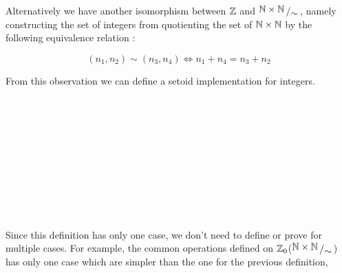 \documentclass{article}
\begin{document}
Alternatively we have another isomorphism between $\mathbb{Z}$ and
$\bigslant{\N\times\N}{\sim}$, namely constructing the set of integers
from quotienting the set of $\mathbb{N}\times\mathbb{N}$ by the following equivalence relation :

\begin{equation}
(n_1 , n_2) \sim (n_3 , n_4)\iff n_1 + n_4 = n_3 + n_2
\end{equation}
 
From this observation we can define a setoid implementation for integers.

\begin{code}\>\<%
\\
%
\\
%
\\
\>  \AgdaSymbol{:}  \<%
\\
\>[0]\<[2]%
\>[2]\AgdaInductiveConstructor{\_,\_} \AgdaSymbol{:}     \<%
\\
%
\\
\> \<[34]%
\>[34]\AgdaSymbol{:}   \AgdaSymbol{\_}\<%
\\
\>\AgdaSymbol{(} \AgdaInductiveConstructor{,} \AgdaSymbol{)}  \AgdaSymbol{(} \AgdaInductiveConstructor{,} \AgdaSymbol{)} \<[24]%
\>[24]\AgdaSymbol{=} \AgdaSymbol{(}  \AgdaSymbol{)}  \AgdaSymbol{(}  \AgdaSymbol{)}\<%
\\
%
\\
\>\<\end{code}
 Since this definition has only one case, we don't need to define or prove for multiple cases. For example, the common operations defined on $\mathbb{Z}_0$($\bigslant{\N\times\N}{\sim}$) has only one case which are simpler than the one for the previous definition,

\begin{code}\>\<%
\\
%
\\
\> \AgdaSymbol{:}     \<%
\\
\>\AgdaSymbol{(} \AgdaInductiveConstructor{,} \AgdaSymbol{)}  \AgdaSymbol{(} \AgdaInductiveConstructor{,} \AgdaSymbol{)} \AgdaSymbol{=} \AgdaSymbol{(}  \AgdaSymbol{)} \AgdaInductiveConstructor{,} \AgdaSymbol{(}  \AgdaSymbol{)}\<%
\\
%
\\
\>\<\end{code}
\end{document}

